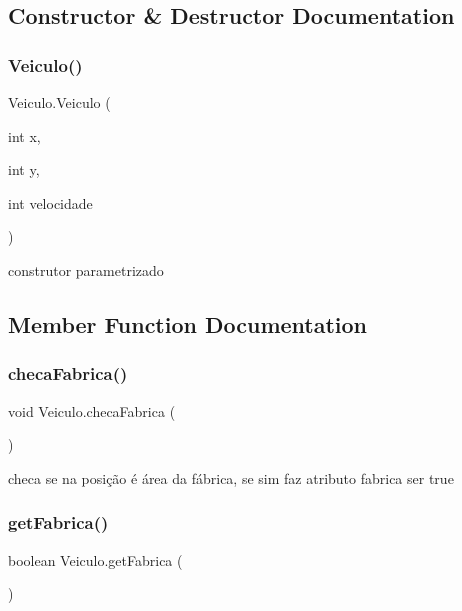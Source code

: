 \subsection{Constructor \& Destructor Documentation}
\mbox{\label{class_veiculo_aa4854ce911d37f725ce5374c1dee62af}} 
\subsubsection{\texorpdfstring{Veiculo()}{Veiculo()}}
{\footnotesize\ttfamily Veiculo.\+Veiculo (\begin{DoxyParamCaption}\item[{int}]{x,  }\item[{int}]{y,  }\item[{int}]{velocidade }\end{DoxyParamCaption})}



construtor parametrizado 



\subsection{Member Function Documentation}
\mbox{\label{class_veiculo_aa0233fb9ba21481a8f43780270a5f9ec}} 
\subsubsection{\texorpdfstring{checa\+Fabrica()}{checaFabrica()}}
{\footnotesize\ttfamily void Veiculo.\+checa\+Fabrica (\begin{DoxyParamCaption}{ }\end{DoxyParamCaption})}

checa se na posição é área da fábrica, se sim faz atributo fabrica ser true\mbox{\label{class_veiculo_a6447f0eeb99399f1f96e835c22a88479}} 
\subsubsection{\texorpdfstring{get\+Fabrica()}{getFabrica()}}
{\footnotesize\ttfamily boolean Veiculo.\+get\+Fabrica (\begin{DoxyParamCaption}{ }\end{DoxyParamCaption})}



